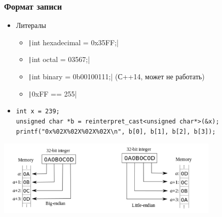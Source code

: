 \documentclass[xetex,mathserif,serif]{beamer}
\begin{document}
	\begin{frame}[fragile]
		\frametitle{Формат записи}
		\begin{itemize}
			\item Литералы
			\begin{itemize}
				\item \texttt|int hexadecimal = 0x35FF;|
				\item \texttt|int octal = 03567;|
				\item \texttt|int binary = 0b00100111;| (С++14, может не работать) 
				\item \texttt|0xFF == 255|
			\end{itemize}
			\item 
			\begin{footnotesize}
				\begin{verbatim}
int x = 239;
unsigned char *b = reinterpret_cast<unsigned char*>(&x);
printf("0x%02X%02X%02X%02X\n", b[0], b[1], b[2], b[3]);
				\end{verbatim}
			\end{footnotesize}
		\end{itemize}
		\begin{center}
			\includegraphics[width=0.8\textwidth]{little-endian-big-endian.png}
		\end{center}
	\end{frame}
\end{document}
